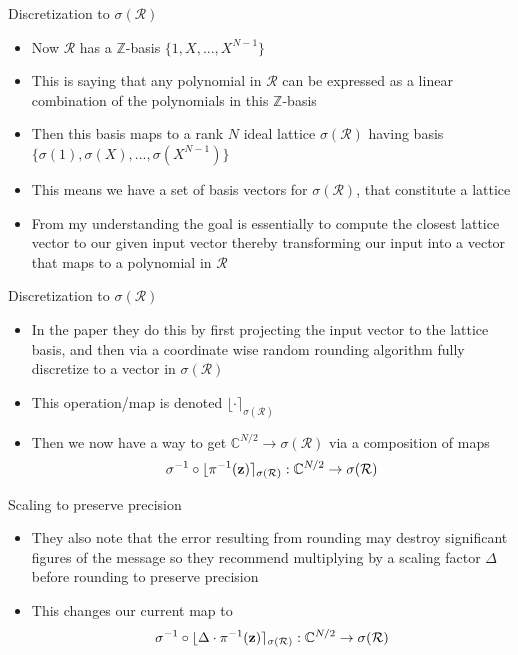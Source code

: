 \documentclass{beamer}
\begin{document}
\begin{frame}{Discretization to $\sigma(\mathcal{R})$}
	\begin{itemize}[<+->]
		\item Now $\mathcal{R}$ has a $\mathbb{Z}$-basis $\{1,X,...,X^{N-1}\}$
		\item This is saying that any polynomial in $\mathcal{R}$ can be expressed as a linear combination of the polynomials
		in this $\mathbb{Z}$-basis
		\item Then this basis maps to a rank $N$ ideal lattice $\sigma(\mathcal{R})$ having basis $\{\sigma(1),\sigma(X),...,\sigma(X^{N-1})\}$
		\item This means we have a set of basis vectors for $\sigma(\mathcal{R})$, that constitute a lattice
		\item From my understanding the goal is essentially to compute the closest lattice vector to our given input vector
		thereby transforming our input into a vector that maps to a polynomial in $\mathcal{R}$
	\end{itemize}
\end{frame}

\begin{frame}{Discretization to $\sigma(\mathcal{R})$}
	\begin{itemize}[<+->]
		\item In the paper they do this by first projecting the input vector to the lattice basis, and then via a coordinate
		wise random rounding algorithm fully discretize to a vector in $\sigma(\mathcal{R})$
		\item This operation/map is denoted $\lfloor \cdot \rceil_{\sigma(\mathcal{R})}$
		\item Then we now have a way to get $\mathbb{C}^{N/2} \to \sigma(\mathcal{R})$ via a composition of maps
		\[ \sigma^{-1 } \circ \lfloor \pi^{-1}({\bf z}) \rceil_{\sigma(\mathcal{R})} : \mathbb{C}^{N/2} \to \sigma(\mathcal{R})\]
	\end{itemize}
\end{frame}


\begin{frame}{Scaling to preserve precision}
	\begin{itemize}[<+->]
		\item They also note that the error resulting from rounding may destroy significant figures of the message so they recommend
		multiplying by a scaling factor $\Delta$ before rounding to preserve precision
		\item This changes our current map to
		\[ \sigma^{-1 } \circ \lfloor \Delta \cdot \pi^{-1}({\bf z}) \rceil_{\sigma(\mathcal{R})} : \mathbb{C}^{N/2} \to \sigma(\mathcal{R})\]
	\end{itemize}
\end{frame}
\end{document}
